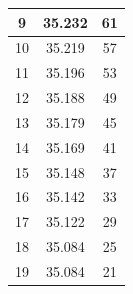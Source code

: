 \documentclass{article}
\theoremstyle{mytheoremstyle}
\theoremstyle{mytheoremstyle}
\theoremstyle{myproblemstyle}
\begin{document}
\begin{tabular}{|c|c|c|}
	9                & 35.232                                                                            & 61                                                                                    \\ \hline
	10               & 35.219                                                                            & 57                                                                                    \\ \hline
	11               & 35.196                                                                            & 53                                                                                    \\ \hline
	12               & 35.188                                                                            & 49                                                                                    \\ \hline
	13               & 35.179                                                                            & 45                                                                                    \\ \hline
	14               & 35.169                                                                            & 41                                                                                    \\ \hline
	15               & 35.148                                                                            & 37                                                                                    \\ \hline
	16               & 35.142                                                                            & 33                                                                                    \\ \hline
	17               & 35.122                                                                            & 29                                                                                    \\ \hline
	18               & 35.084                                                                            & 25                                                                                    \\ \hline
	19               & 35.084                                                                            & 21                                                                                    \\ \hline

\end{tabular}
\end{document}
